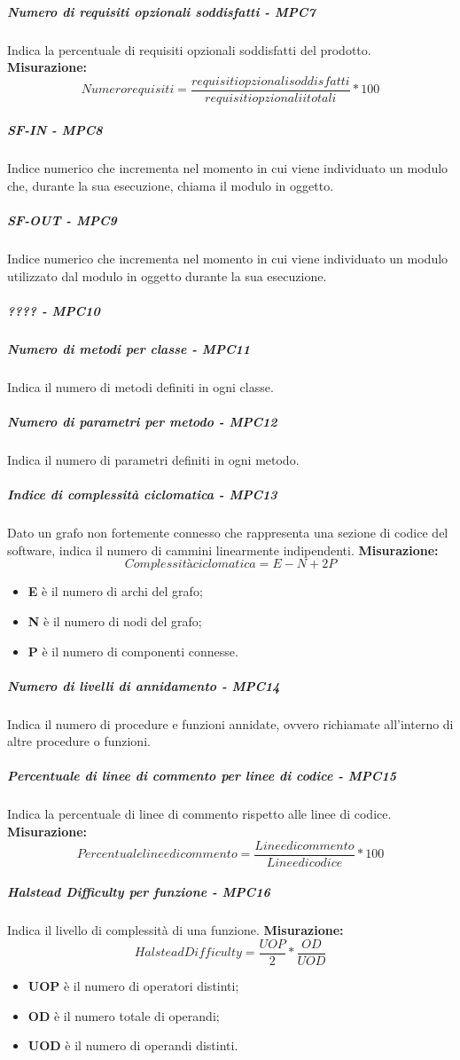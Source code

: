 \subparagraph{Numero di requisiti opzionali soddisfatti - MPC7}
Indica la percentuale di requisiti opzionali soddisfatti del prodotto.
\textbf{Misurazione:}\begin{equation}
Numero requisiti = \frac{requisiti opzionali soddisfatti}{requisiti opzionalii totali} * 100
\end{equation}
\subparagraph{SF-IN - MPC8}
Indice numerico che incrementa nel momento in cui viene individuato un modulo che, durante la sua esecuzione, chiama il modulo in oggetto.
\subparagraph{SF-OUT - MPC9}
Indice numerico che incrementa nel momento in cui viene individuato un modulo utilizzato dal modulo in oggetto durante la sua esecuzione.
\subparagraph{???? - MPC10}

\subparagraph{Numero di metodi per classe - MPC11}
Indica il numero di metodi definiti in ogni classe.
\subparagraph{Numero di parametri per metodo - MPC12}
Indica il numero di parametri definiti in ogni metodo.
\subparagraph{Indice di complessità ciclomatica - MPC13}
Dato un grafo non fortemente connesso che rappresenta una sezione di codice del software, indica il numero di cammini linearmente indipendenti.
\textbf{Misurazione:}\begin{equation}
Complessità ciclomatica = E - N + 2P
\end{equation}
\begin{itemize}
	\item \textbf{E} è il numero di archi del grafo;
	\item \textbf{N} è il numero di nodi del grafo;
	\item \textbf{P} è il numero di componenti connesse.
\end{itemize}
\subparagraph{Numero di livelli di annidamento - MPC14}
Indica il numero di procedure e funzioni annidate, ovvero richiamate all'interno di altre procedure o funzioni.
\subparagraph{Percentuale di linee di commento per linee di codice - MPC15}
Indica la percentuale di linee di commento rispetto alle linee di codice.
\textbf{Misurazione:}\begin{equation}
Percentuale linee di commento = \frac{Linee di commento}{Linee di codice} * 100
\end{equation}
\subparagraph{Halstead Difficulty per funzione - MPC16}
Indica il livello di complessità di una funzione.
\textbf{Misurazione:}\begin{equation}
Halstead Difficulty = \frac{UOP}{2} * \frac{OD}{UOD}
\end{equation}	
\begin{itemize}
	\item \textbf{UOP} è il numero di operatori distinti;
	\item \textbf{OD} è il numero totale di operandi;
	\item \textbf{UOD} è il numero di operandi distinti.
\end{itemize}
